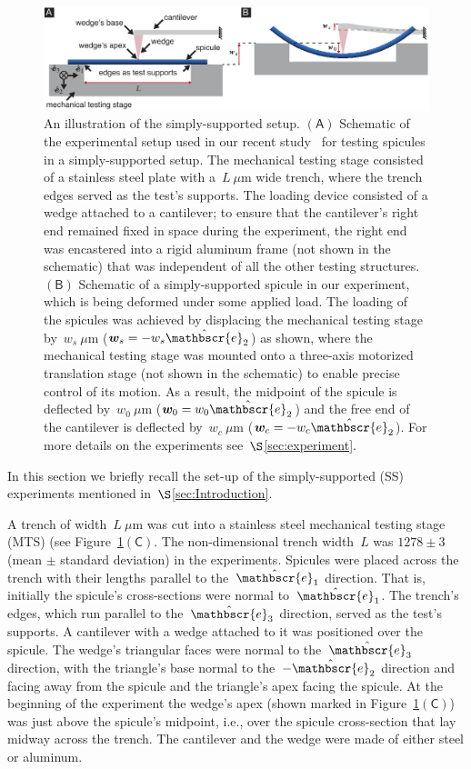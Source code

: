 \documentclass[preprint,10pt,times]{elsarticle}
\numberwithin{equation}{section}
\newcommand{\ndL}{L}
\newcommand{\physe}{\hat{\mathbscr{e}}} %
\newcommand{\physwc}{\bm{w}_c}
\newcommand{\physws}{\bm{w}_s}
\newcommand{\physwo}{\bm{w}_0}
\newcommand{\pr}[1]{\left( #1 \right)}
\newcommand{\subf}[1]{\pr{\textsf{#1}}}
\begin{document}
\begin{figure}
\centering{}
\includegraphics[width=1\textwidth]{../Figures_Submit/SSsetup_V4.pdf}\caption{\label{fig:SSsetup}
An illustration of the simply-supported setup. %
$\subf{A}$
Schematic of the experimental setup used in our recent study~\cite{Sayaka2021Sawtooth} for testing spicules in a simply-supported setup. %
The mechanical testing stage consisted of a stainless steel plate with a~$L~\mu$m wide trench, where the trench edges served as the test's supports. %
The loading device consisted of a wedge attached to a cantilever; to ensure that the
cantilever's right end remained fixed in space during the experiment,
the right end was encastered into a rigid aluminum frame (not shown
in the schematic) that was independent of all the other testing structures. %
$\subf{B}$ Schematic of a simply-supported spicule in our experiment, which is
being deformed under some applied load. %
The loading of the spicules was achieved by displacing the mechanical testing stage by~$w_s~\mu$m
($\physws=-w_s\physe_2$) as shown, where the mechanical testing stage
was mounted onto a three-axis motorized translation stage (not shown
in the schematic) to enable precise control of its motion. %
As a result, the midpoint of the spicule is deflected by~$w_0~\mu$m ($\physwo=w_0\physe_2$)
and the free end of the cantilever is deflected by~$w_c~\mu$m ($\physwc=-w_c\physe_2$). %
For more details on the experiments
see~$\S$\ref{sec:experiment}. %
}
\end{figure}

In this section we briefly recall the set-up of the simply-supported
(SS) experiments mentioned in~$\S$\ref{sec:Introduction}.

A trench of width~$\ndL~\mu$m was cut into a stainless steel mechanical
testing stage (MTS) (see Figure~\ref{fig:SSsetup}$\subf{C}$. The
non-dimensional trench width~$\ndL$ was $1278\pm3$ (mean $\pm$ standard deviation) in
the experiments. Spicules were placed across the trench with their
lengths parallel to the~$\physe_1$ direction. That is, initially
the spicule's cross-sections were normal to~$\physe_1$. The trench's
edges, which run parallel to the~$\physe_3$ direction, served as
the test's supports. A cantilever with a wedge attached to it was
positioned over the spicule. The wedge's triangular faces were normal
to the~$\physe_3$ direction, with the triangle's base normal to the~$-\physe_2$
direction and facing away from the spicule and the triangle's apex
facing the spicule. At the beginning of the experiment the wedge's
apex (shown marked in Figure~\ref{fig:SSsetup}$\subf{C}$) was just
above the spicule's midpoint, i.e., over the spicule cross-section
that lay midway across the trench. The cantilever and the wedge were
made of either steel or aluminum.
\end{document}
